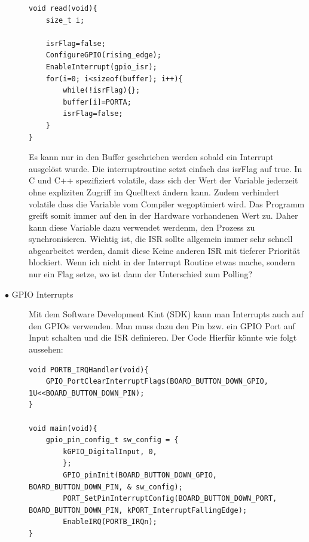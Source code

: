 \documentclass[a4paper, 8pt]{extarticle}
\begin{document}
\begin{multicols*}{3}
\begin{description}
\begin{lstlisting}
void read(void){
	size_t i;

	isrFlag=false;
	ConfigureGPIO(rising_edge);
	EnableInterrupt(gpio_isr);
	for(i=0; i<sizeof(buffer); i++){
		while(!isrFlag){};
		buffer[i]=PORTA;
		isrFlag=false;
	}
}
							\end{lstlisting} 	
							Es kann nur in den Buffer geschrieben werden sobald ein Interrupt ausgelöst wurde. Die interruptroutine setzt einfach das isrFlag auf true.
							In C und C++ spezifiziert volatile, dass sich der Wert der Variable jederzeit ohne expliziten Zugriff im Quelltext ändern kann.	Zudem verhindert volatile 
							dass die Variable vom Compiler wegoptimiert wird. Das Programm greift somit immer auf den in der Hardware vorhandenen Wert zu. Daher kann diese Variable
							dazu verwendet werdenm, den Prozess zu synchronisieren. Wichtig ist, die ISR sollte allgemein immer sehr schnell abgearbeitet werden, damit diese
							Keine anderen ISR mit tieferer Priorität blockiert.	Wenn ich nicht in der Interrupt Routine etwas mache, sondern nur ein Flag setze, wo 
							ist dann der Unterschied zum Polling?
						\item[$\bullet$ GPIO Interrupts]
							Mit dem Software Development Kint (SDK) kann man Interrupts auch auf den GPIOs verwenden. Man muss dazu den Pin bzw. ein GPIO Port 
							auf Input schalten und die ISR definieren. Der Code Hierfür könnte wie folgt aussehen:
							\begin{lstlisting}
void PORTB_IRQHandler(void){
	GPIO_PortClearInterruptFlags(BOARD_BUTTON_DOWN_GPIO, 1U<<BOARD_BUTTON_DOWN_PIN);
}

void main(void){
	gpio_pin_config_t sw_config = {
		kGPIO_DigitalInput, 0,	
		};
		GPIO_pinInit(BOARD_BUTTON_DOWN_GPIO, BOARD_BUTTON_DOWN_PIN, & sw_config);
		PORT_SetPinInterruptConfig(BOARD_BUTTON_DOWN_PORT, BOARD_BUTTON_DOWN_PIN, kPORT_InterruptFallingEdge);
		EnableIRQ(PORTB_IRQn);
}
							\end{lstlisting} 	
					\end{description}

\end{multicols*}
\end{document}
